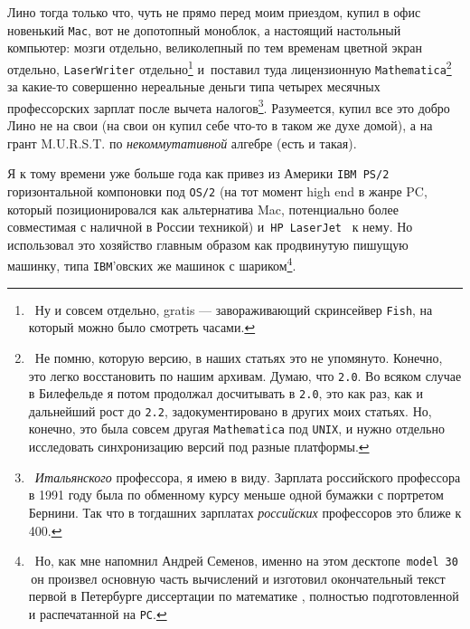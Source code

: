 \documentclass[intlimits,twoside,a4paper,11pt]{article}
\begin{document}
	Лино тогда только что, чуть не прямо перед моим приездом, купил в офис новенький 
	{\tt Mac}, 
	вот не допотопный моноблок, а настоящий настольный компьютер: мозги отдельно,
	великолепный по тем временам цветной экран отдельно,
	{\tt LaserWriter} отдельно\footnote{~Ну и совсем отдельно, gratis ---
		завораживающий скринсейвер {\tt Fish}, на который можно было смотреть часами.}
	и~поставил туда лицензионную {\tt Mathematica}\footnote{~Не помню, которую версию, 
		в наших статьях это не упомянуто. Конечно, это легко восстановить по нашим архивам.
		Думаю, что {\tt 2.0}. Во всяком случае в Билефельде я потом продолжал досчитывать в 
		{\tt 2.0}, 
		это как раз, как и дальнейший рост до {\tt 2.2}, задокументировано в других моих статьях.
		Но, конечно, это была совсем другая {\tt Mathematica} под {\tt UNIX}, и нужно отдельно 
		исследовать синхронизацию версий под разные платформы.}
	за какие-то совершенно нереальные деньги типа четырех месячных профессорских 
	зарплат после вычета налогов\footnote{{~\it Итальянского\/} профессора, я имею в виду. 
		Зарплата российского профессора в 1991 году была по обменному курсу меньше одной
		бумажки с портретом Бернини. Так что в тогдашних зарплатах {\it российских\/} 
		профессоров это ближе к 400.}.
	Разумеется, купил все это добро Лино не на свои (на свои он купил себе что-то в
	таком же духе домой), а на грант M.U.R.S.T. по 
	{\it некоммутативной\/} алгебре (есть и такая).
	\par
	Я к тому времени уже больше года как привез из Америки %
	{\tt IBM PS/2} горизонтальной компоновки под {\tt OS/2} (на тот момент high end в жанре PC,
	который позиционировался как альтернатива Mac, потенциально более совместимая 
	с наличной в России техникой) 
	и \,{\tt HP~LaserJet} \, к нему. Но
	использовал это хозяйство главным образом как продвинутую пишущую машинку,
	типа {\tt IBM}'овских же машинок с шариком\footnote{~Но, как мне напомнил Андрей Семенов,
		именно на этом десктопе \,{\tt model 30\/} \,он произвел основную часть вычислений и 
		изготовил окончательный текст первой в Петербурге диссертации по математике 
		\cite{Se}, полностью подготовленной и распечатанной на {\tt PC}.}. 
	
\end{document}
